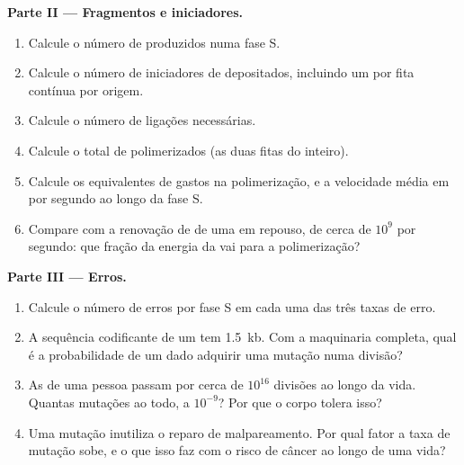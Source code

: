 \begin{problem}
\medskip
\noindent\textbf{Parte II --- Fragmentos e iniciadores.}
\begin{enumerate}[resume]
  \item Calcule o número de  produzidos numa fase S.
  \item Calcule o número de iniciadores de  depositados, incluindo um
        por fita contínua por origem.
  \item Calcule o número de ligações necessárias.
  \item Calcule o total de  polimerizados (as duas fitas do
         inteiro).
  \item Calcule os equivalentes de  gastos na polimerização, e a
        velocidade média em  por segundo ao longo da fase S.
  \item Compare com a renovação de  de uma  em repouso, de
        cerca de $10^9$ por segundo: que fração da energia da  vai
        para a polimerização?
\end{enumerate}

\medskip
\noindent\textbf{Parte III --- Erros.}
\begin{enumerate}[resume]
  \item Calcule o número de erros por fase S em cada uma das três taxas
        de erro.
  \item A sequência codificante de um  tem \qty{1.5}{kb}. Com a
        maquinaria completa, qual é a probabilidade de um dado 
        adquirir uma mutação numa divisão?
  \item As  de uma pessoa passam por cerca de $10^{16}$ divisões
        ao longo da vida. Quantas mutações ao todo, a $10^{-9}$? Por que
        o corpo tolera isso?
  \item Uma mutação inutiliza o reparo de malpareamento. Por qual fator
        a taxa de mutação sobe, e o que isso faz com o risco de câncer
        ao longo de uma vida?
\end{enumerate}


\end{problem}
